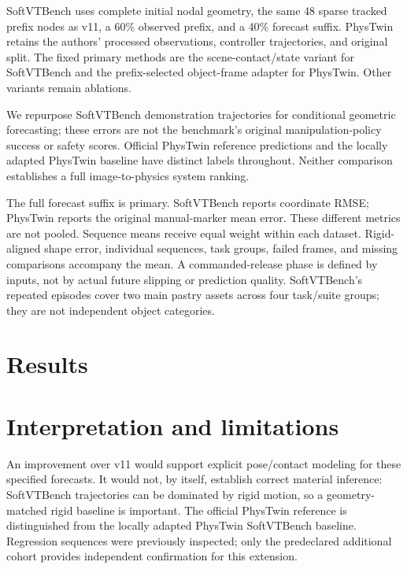 \documentclass[10pt]{article}
\begin{document}
SoftVTBench uses complete initial nodal geometry, the same 48 sparse tracked prefix nodes as v11, a 60\% observed prefix, and a 40\% forecast suffix. PhysTwin retains the authors' processed observations, controller trajectories, and original split. The fixed primary methods are the scene-contact/state variant for SoftVTBench and the prefix-selected object-frame adapter for PhysTwin. Other variants remain ablations.

We repurpose SoftVTBench demonstration trajectories for conditional geometric forecasting; these errors are not the benchmark's original manipulation-policy success or safety scores. Official PhysTwin reference predictions and the locally adapted PhysTwin baseline have distinct labels throughout. Neither comparison establishes a full image-to-physics system ranking.

The full forecast suffix is primary. SoftVTBench reports coordinate RMSE; PhysTwin reports the original manual-marker mean error. These different metrics are not pooled. Sequence means receive equal weight within each dataset. Rigid-aligned shape error, individual sequences, task groups, failed frames, and missing comparisons accompany the mean. A commanded-release phase is defined by inputs, not by actual future slipping or prediction quality. SoftVTBench's repeated episodes cover two main pastry assets across four task/suite groups; they are not independent object categories.

\section{Results}

\section{Interpretation and limitations}
An improvement over v11 would support explicit pose/contact modeling for these specified forecasts. It would not, by itself, establish correct material inference: SoftVTBench trajectories can be dominated by rigid motion, so a geometry-matched rigid baseline is important. The official PhysTwin reference is distinguished from the locally adapted PhysTwin SoftVTBench baseline. Regression sequences were previously inspected; only the predeclared additional cohort provides independent confirmation for this extension.
\end{document}
